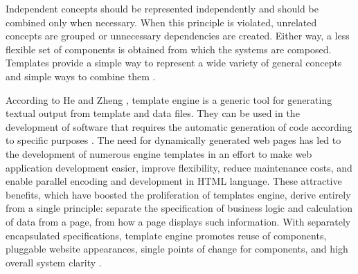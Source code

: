 Independent concepts should be represented independently and should be combined only when necessary. When this principle is violated, unrelated concepts are grouped or unnecessary dependencies are created. Either way, a less flexible set of components is obtained from which the systems are composed. Templates provide a simple way to represent a wide variety of general concepts and simple ways to combine them \cite{stroustrup1997}.


According to He and Zheng \cite{he2009}, template engine is a generic tool for generating textual output from template and data files. They can be used in the development of software that requires the automatic generation of code according to specific purposes \cite{benato2017}. The need for dynamically generated web pages has led to the development of numerous engine templates in an effort to make web application development easier, improve flexibility, reduce maintenance costs, and enable parallel encoding and development in HTML language. These attractive benefits, which have boosted the proliferation of templates engine, derive entirely from a single principle: separate the specification of business logic and calculation of data from a page, from how a page displays such information. With separately encapsulated specifications, template engine promotes reuse of components, pluggable website appearances, single points of change for components, and high overall system clarity \cite{parr2004}.

